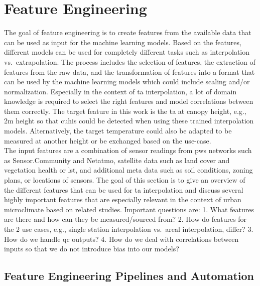 \section{Feature Engineering}
\label{sec:feature_engineering}

The goal of feature engineering is to create features from the available data that can be used as input for the machine learning models. Based on the features, different models can be used for completely different tasks such as interpolation vs.\ extrapolation. The process includes the selection of features, the extraction of features from the raw data, and the transformation of features into a format that can be used by the machine learning models which could include scaling and/or normalization. Especially in the context of \gls{ta} interpolation, a lot of domain knowledge is required to select the right features and model correlations between them correctly. The target feature in this work is the \gls{ta} at canopy height, e.g., 2m height so that \gls{cuhi}s could be detected when using these trained interpolation models. Alternatively, the target temperature could also be adapted to be measured at another height or be exchanged based on the use-case.\\
The input features are a combination of sensor readings from \gls{pws} networks such as Sensor.Community and Netatmo, satellite data such as land cover and vegetation health or \gls{lst}, and additional meta data such as soil conditions, zoning plans, or locations of sensors. The goal of this section is to give an overview of the different features that can be used for \gls{ta} interpolation and discuss several highly important features that are especially relevant in the context of urban microclimate based on related studies. Important questions are: 1. What features are there and how can they be measured/sourced from? 2. How do features for the 2 use cases, e.g., single station interpolation vs.\ areal interpolation, differ? 3. How do we handle \gls{qc} outputs? 4. How do we deal with correlations between inputs so that we do not introduce bias into our models?

\subsection{Feature Engineering Pipelines and Automation}

